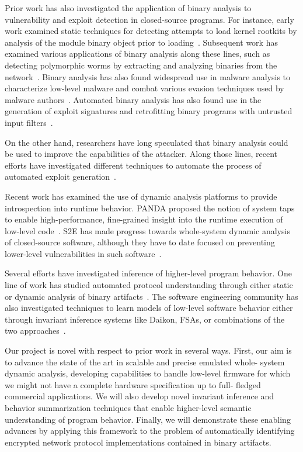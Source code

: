 \documentclass[letterpaper,twoside,11pt,headings=small]{scrartcl}
\begin{document}
Prior work has also investigated the application of binary analysis to
vulnerability and exploit detection in closed-source programs.  For instance,
early work examined static techniques for detecting attempts to load kernel
rootkits by analysis of the module binary object prior to
loading~\cite{kruegel:acsac2004:kernel}.  Subsequent work has examined various
applications of binary analysis along these lines, such as detecting
polymorphic worms by extracting and analyzing binaries from the
network~\cite{kruegel:raid2005:worm}. Binary analysis has also found
widespread use in malware analysis to characterize low-level malware and
combat various evasion techniques used by malware
authors~\cite{moser:ssp2007:malware,bayer:ndss2009:malware,sharif:ssp2009:malware}.
Automated binary analysis has also found use in the generation of exploit
signatures and retrofitting binary programs with untrusted input
filters~\cite{newsome:ssp2005:filter,brumley:ssp2006:filter,brumley:csf2007:filter}.

On the other hand, researchers have long speculated that binary analysis could
be used to improve the capabilities of the attacker.  Along those lines,
recent efforts have investigated different techniques to automate the
process of automated exploit generation~\cite{avgerinos:ndss2011:aeg,schwartz:sec2011:q,cha:oakland2012:mayhem}.

Recent work has examined the use of dynamic analysis platforms to provide
introspection into runtime behavior.  PANDA proposed the notion of system
taps to enable high-performance, fine-grained insight into the runtime
execution of low-level code~\cite{dolangavitt:2013:tzb}.  S2E has made
progress towards whole-system dynamic analysis of closed-source software,
although they have to date focused on preventing lower-level vulnerabilities
in such software~\cite{chipounov:asplos2011:s2e}.

Several efforts have investigated inference of higher-level program behavior.
One line of work has studied automated protocol understanding through either
static or dynamic analysis of binary
artifacts~\cite{caballero:ccs2007:polyglot,wondracek:ndss2008:protocol}.  The
software engineering community has also investigated techniques to learn
models of low-level software behavior either through invariant inference
systems like Daikon, FSAs, or combinations of the two
approaches~\cite{ernst:2009:daikon,csallner:icse2008:dysy,krka:icsa2010:inference}.

Our project is novel with respect to prior work in several ways.  First, our
aim is to advance the state of the art in scalable and precise emulated whole-
system dynamic analysis, developing capabilities to handle low-level firmware
for which we might not have a complete hardware specification up to full-
fledged commercial applications.  We will also develop novel invariant
inference and behavior summarization techniques that enable higher-level
semantic understanding of program behavior.  Finally, we will demonstrate
these enabling advances by applying this framework to the problem of
automatically identifying encrypted network protocol implementations contained
in binary artifacts.
\end{document}
